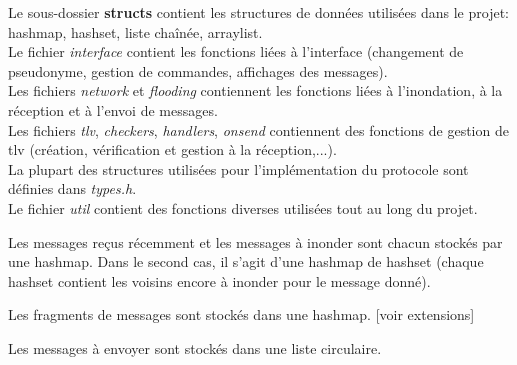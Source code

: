 \documentclass[a4paper,10pt]{article} %
\begin{document}
Le sous-dossier \textbf{structs} contient les structures de données utilisées dans le projet: hashmap, hashset, liste chaînée, arraylist.\\

Le fichier \textit{interface} contient les fonctions liées à l'interface (changement de pseudonyme, gestion de commandes, affichages des messages).\\

Les fichiers \textit{network} et \textit{flooding} contiennent les fonctions liées à l'inondation, à la réception et à l'envoi de messages.\\

Les fichiers \textit{tlv}, \textit{checkers}, \textit{handlers}, \textit{onsend} contiennent des fonctions de gestion de tlv (création, vérification et gestion à la réception,...).\\

La plupart des structures utilisées pour l'implémentation du protocole sont définies dans \textit{types.h}.\\

Le fichier \textit{util} contient des fonctions diverses utilisées tout au long du projet.


Les messages reçus récemment et les messages à inonder sont chacun stockés par une hashmap. Dans le second cas, il s'agit d'une hashmap de hashset (chaque hashset contient les voisins encore à inonder pour le message donné).

Les fragments de messages sont stockés dans une hashmap. [voir extensions]

Les messages à envoyer sont stockés dans une liste circulaire.
\end{document}
